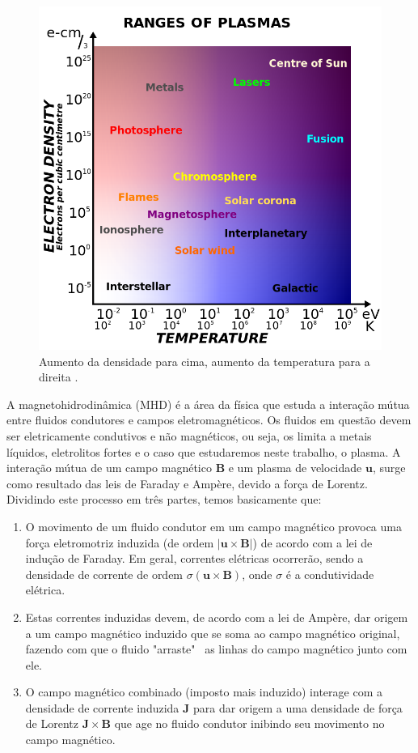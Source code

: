 \documentclass[12pt,oneside,a4paper]{abntex2}
\begin{document}
\begin{figure}[H]
\centering
\includegraphics[scale=0.3]{faixaplasma.png}   
\caption{Aumento da densidade para cima, aumento da temperatura para a direita \cite{figplasma}.}
\label{fig: plasmafaixa}
\end{figure}

A magnetohidrodinâmica (MHD) é a área da física que estuda a interação mútua entre fluidos condutores e campos eletromagnéticos. 
Os fluidos em questão devem ser eletricamente condutivos e não magnéticos, ou seja, os limita a metais líquidos, eletrolitos fortes e o caso que estudaremos neste trabalho, o plasma. 
A interação mútua de um campo magnético $\bm{B}$ e um plasma de velocidade $\bm{u}$, surge como resultado das leis de Faraday e Ampère, devido a força de Lorentz.  
Dividindo este processo em três partes, temos basicamente que:
\begin{enumerate}
\item O movimento de um fluido condutor em um campo magnético provoca uma força eletromotriz induzida (de ordem $|\bm{u} \times \bm{B} | $) de acordo com a lei de indução de Faraday.  Em geral, correntes elétricas ocorrerão, sendo a densidade de corrente de ordem $\sigma (\bm{u} \times \bm{B})$, onde $\sigma$ é a condutividade elétrica. 
\item Estas correntes induzidas devem, de acordo com a lei de Ampère, dar origem a um campo magnético induzido que se soma ao campo magnético original, fazendo com que o fluido "arraste" \ as linhas do campo magnético junto com ele. 
\item O campo magnético combinado (imposto mais induzido) interage com a densidade de corrente induzida $\bm{J}$ para dar origem a uma densidade de força de Lorentz $\bm{J} \times \bm{B}$ que age no fluido condutor inibindo seu movimento no  campo magnético.  
\end{enumerate} 
\end{document}

